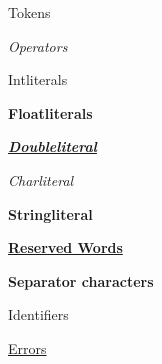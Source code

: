 \documentclass [xcolor=svgnames, t] {beamer}
\begin{document}
\begin{frame}{Tokens}
\begin{itemize}
\color{OrangeRed}
\item \emph{Operators}
\color{purple}
{ \selectfont \item Intliterals}
\color{Turquoise}
{ \selectfont \item \textbf{Floatliterals}}
\color{CadetBlue}
{ \selectfont \item \underline{\emph{\textbf{Doubleliteral}}}}
\color{Violet}
{ \selectfont \item \emph{Charliteral}}
\color{ForestGreen}
{ \selectfont \item \textbf{Stringliteral}}
\color{olive}
\item \underline{\textbf{Reserved Words}}
\color{Black}
\item \textbf{Separator characters}
\color{blue}
\item Identifiers
\color{Pink}
{ \selectfont \item \underline{Errors}}
\end{itemize}
\end{frame}
\end{document}
